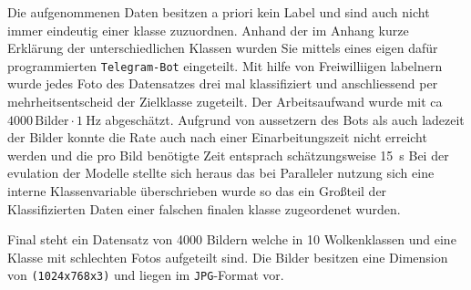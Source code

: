 Die aufgenommenen Daten besitzen a priori kein Label und sind auch nicht immer
eindeutig einer klasse zuzuordnen.
Anhand der im Anhang kurze Erklärung der unterschiedlichen Klassen wurden Sie
mittels eines eigen dafür programmierten \texttt{Telegram-Bot} eingeteilt.
Mit hilfe von Freiwilliigen labelnern wurde jedes Foto des Datensatzes drei mal
klassifiziert und anschliessend per mehrheitsentscheid der Zielklasse zugeteilt.
Der Arbeitsaufwand wurde mit ca $\num{4000} \, \text{Bilder} \cdot \SI{1}{\hertz}$
abgeschätzt.
Aufgrund von aussetzern des Bots als auch ladezeit der Bilder konnte die Rate
auch nach einer Einarbeitungszeit nicht erreicht werden und die pro Bild benötigte Zeit entsprach schätzungsweise
\SI{15}{\second}
Bei der evulation der Modelle stellte sich heraus das bei Paralleler nutzung
sich eine interne Klassenvariable überschrieben wurde so das ein Großteil der
Klassifizierten Daten einer falschen finalen klasse zugeordenet wurden. 

Final steht ein Datensatz von \num{4000} Bildern welche in 10 Wolkenklassen und
eine Klasse mit schlechten Fotos aufgeteilt sind. Die Bilder besitzen eine Dimension 
von \texttt{(1024x768x3)} und liegen im \texttt{JPG}-Format vor.

